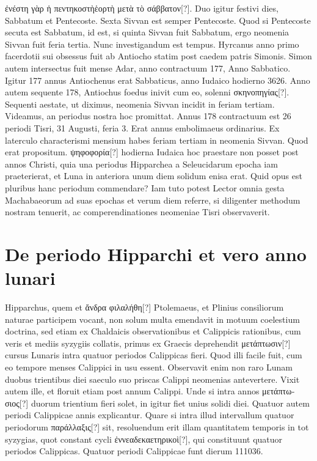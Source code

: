 \textgreek{ἐνέστη γὰρ
ἡ πεντηκοστὴἑορτὴ μετὰ τὸ σάββατον[?]}.
Duo igitur festivi dies, Sabbatum et
Pentecoste.
Sexta Sivvan est semper Pentecoste.
Quod si Pentecoste
secuta est Sabbatum, id est, si quinta Sivvan fuit Sabbatum, ergo neomenia
Sivvan fuit feria tertia.
Nunc investigandum est tempus. Hyrcanus
anno primo facerdotii sui obsessus fuit ab Antiocho statim post
caedem patris Simonis.
Simon autem intersectus fuit mense Adar, anno
contractuum 177, Anno Sabbatico.
Igitur 177 annus Antiochenus
erat Sabbaticus, anno Iudaico hodierno 3626.
Anno autem sequente
178, Antiochus foedus inivit cum eo, solenni \textgreek{σκηνοπηγίας[?]}.
Sequenti aestate, ut diximus, neomenia Sivvan incidit in feriam tertiam.
Videamus, an periodus nostra hoc promittat.
Annus 178 contractuum
est 26 periodi Tisri, 31 Augusti, feria 3.
Erat annus embolimaeus ordinarius.
Ex laterculo characterismi mensium habes feriam tertiam in
neomenia Sivvan.
Quod erat propositum.
\textgreek{ψηφοφορία[?]} hodierna Iudaica
hoc praestare non posset post annos Christi, quia una periodus Hipparchea
a Seleucidarum epocha iam praeterierat, et Luna in anteriora
unum diem solidum enisa erat.
Quid opus est pluribus hanc periodum
commendare?
Iam tuto potest Lector omnia gesta Machabaeorum
ad suas epochas et verum diem referre, si diligenter methodum
nostram tenuerit, ac comperendinationes neomeniae Tisri observaverit.

\section{De periodo Hipparchi et vero anno lunari}
Hipparchus, quem et \textgreek{ἄνδρα φιλαλήθη[?]} Ptolemaeus, et Plinius
consiliorum naturae participem vocant, non solum multa emendavit
in motuum coelestium doctrina, sed etiam ex Chaldaicis
observationibus et Calippicis rationibus, cum veris et mediis syzygiis
collatis, primus ex Graecis deprehendit \textgreek{μετάπτωσιν[?]}
 cursus Lunaris intra
quatuor periodos Calippicas fieri.
Quod illi facile fuit, cum eo tempore
menses Calippici in usu essent.
Observavit enim non raro
Lunam duobus trientibus diei saeculo suo priscas Calippi neomenias
antevertere.
Vixit autem ille, et floruit etiam post  annum
Calippi.
Unde si intra  annos \textgreek{μετάπτωσιος[?]}
 duorum trientium fieri
solet, in  igitur fiet unius solidi diei.
Quatuor autem periodi Calippicae
 annis explicantur.
Quare si intra illud intervallum
quatuor periodorum \textgreek{παράλλαξις[?]} sit,
 resoluendum erit illam quantitatem
temporis in tot syzygias, quot constant  cycli
 \textgreek{ἐννεαδεκαετηρικοὶ[?]},
qui constituunt quatuor periodos Calippicas.
Quatuor periodi Calippicae
funt dierum 111036.

